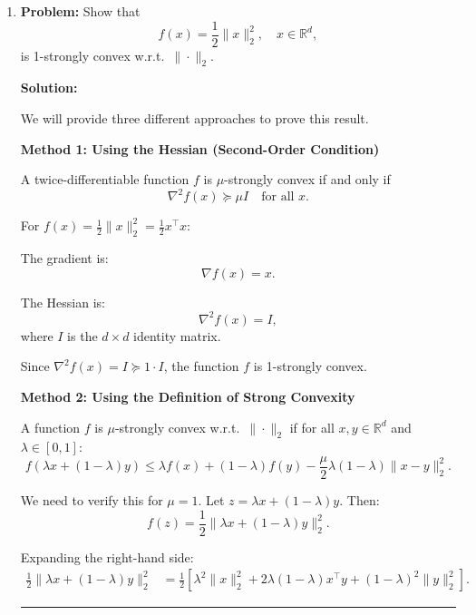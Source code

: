 \documentclass[12pt,letterpaper]{article}
\newenvironment{proof}{\noindent{\bf Proof:}}{\qed\bigskip}
\newcommand{\qed}{\rule{7pt}{7pt}}
\begin{document}
\begin{enumerate}
\begin{proof}
\textbf{Conclusion:} Since for any two points in $C$ and any $\lambda \in [0,1]$, their convex combination also lies in $C$, the set $C$ is convex.

\end{proof}

	
	\item[2.] 
	\textbf{Problem:} Show that
\[
f(x) = \frac{1}{2}\|x\|_2^2, \quad x \in \mathbb{R}^d,
\]
is 1-strongly convex w.r.t.\ $\|\cdot\|_2$.

\bigskip

\textbf{Solution:}

\begin{proof}
We will provide three different approaches to prove this result.

\bigskip

\textbf{Method 1: Using the Hessian (Second-Order Condition)}

A twice-differentiable function $f$ is $\mu$-strongly convex if and only if 
\[
\nabla^2 f(x) \succeq \mu I \quad \text{for all } x.
\]

For $f(x) = \frac{1}{2}\|x\|_2^2 = \frac{1}{2}x^\top x$:

The gradient is:
\[
\nabla f(x) = x.
\]

The Hessian is:
\[
\nabla^2 f(x) = I,
\]
where $I$ is the $d \times d$ identity matrix.

Since $\nabla^2 f(x) = I \succeq 1 \cdot I$, the function $f$ is 1-strongly convex.

\bigskip

\textbf{Method 2: Using the Definition of Strong Convexity}

A function $f$ is $\mu$-strongly convex w.r.t.\ $\|\cdot\|_2$ if for all $x, y \in \mathbb{R}^d$ and $\lambda \in [0,1]$:
\[
f(\lambda x + (1-\lambda)y) \leq \lambda f(x) + (1-\lambda)f(y) - \frac{\mu}{2}\lambda(1-\lambda)\|x - y\|_2^2.
\]

We need to verify this for $\mu = 1$. Let $z = \lambda x + (1-\lambda)y$. Then:
\[
f(z) = \frac{1}{2}\|\lambda x + (1-\lambda)y\|_2^2.
\]

Expanding the right-hand side:
\begin{align*}
\frac{1}{2}\|\lambda x + (1-\lambda)y\|_2^2 &= \frac{1}{2}\left[\lambda^2\|x\|_2^2 + 2\lambda(1-\lambda)x^\top y + (1-\lambda)^2\|y\|_2^2\right].
\end{align*}


\end{proof}
\end{enumerate}
\end{document}
